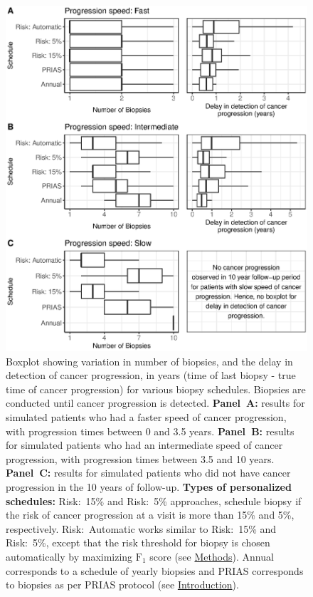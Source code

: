 \begin{figure}[!htb]
\captionsetup{justification=justified}
\centerline{\includegraphics[width=\columnwidth]{images/sim_res_combined.eps}}
\caption{Boxplot showing variation in number of biopsies, and the delay in detection of cancer progression, in years (time of last biopsy - true time of cancer progression) for various biopsy schedules. Biopsies are conducted until cancer progression is detected. \textbf{Panel~A:} results for simulated patients who had a faster speed of cancer progression, with progression times between 0 and 3.5 years. \textbf{Panel~B:} results for simulated patients who had an intermediate speed of cancer progression, with progression times between 3.5 and 10 years. \textbf{Panel~C:} results for simulated patients who did not have cancer progression in the 10 years of follow-up. \textbf{Types of personalized schedules:} Risk:~15\% and Risk:~5\% approaches, schedule biopsy if the risk of cancer progression at a visit is more than 15\% and 5\%, respectively. Risk:~Automatic works similar to Risk:~15\% and Risk:~5\%, except that the risk threshold for biopsy is chosen automatically by maximizing $\mbox{F}_1$ score (see \hyperref[sec:methods]{Methods}). Annual corresponds to a schedule of yearly biopsies and PRIAS corresponds to biopsies as per PRIAS protocol (see \hyperref[sec:introduction]{Introduction}).}
\label{fig:sim_res_combined}
\end{figure}

